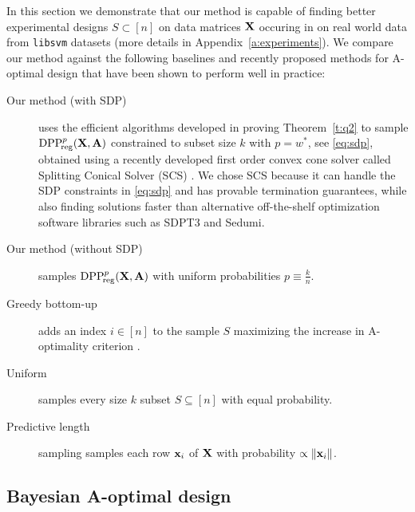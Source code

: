 In this section we demonstrate that our method is capable of finding better
experimental designs $S \subset [n]$ on data matrices $\mathbf X$ occuring in on real
world data from \texttt{libsvm} datasets \citep{libsvm} (more details in
Appendix~\ref{a:experiments}).
We compare our method against the following baselines and recently proposed methods
for A-optimal design that have been shown to perform well in
practice:
\begin{description}
    \item[Our method (with SDP)] uses the efficient algorithms
        developed in proving Theorem~\ref{t:q2} to sample
        ${{\mathrm{DPP}}_{\!\mathrm{reg}}^{p}}(\mathbf X,\mathbf A)$ constrained to subset size $k$
        with $p = w^*$, see \eqref{eq:sdp},
        obtained using a         recently developed first order convex cone solver called Splitting
        Conical Solver (SCS) \citep{o2016conic}.
        We chose SCS because it can handle the SDP constraints in
        \eqref{eq:sdp} and has provable termination guarantees, while
        also finding solutions faster \citep{o2016conic} than alternative
        off-the-shelf optimization software libraries such as SDPT3 and Sedumi.

    \item[Our method (without SDP)] samples ${{\mathrm{DPP}}_{\!\mathrm{reg}}^{p}}(\mathbf X,\mathbf A)$ with uniform
      probabilities $p \equiv \frac{k}{n}$.

          \item[Greedy bottom-up] adds an index $i \in [n]$ to the sample $S$
        maximizing the increase in A-optimality criterion
        \citep{greedy-supermodular,chamon2017approximate}.

    \item[Uniform] samples every size $k$ subset $S \subseteq [n]$
        with equal probability.

    \item[Predictive length] sampling \citep{zhu2015optimal} samples
        each row $\mathbf x_i$ of $\mathbf X$ with probability $\propto\|\mathbf x_i\|$.
\end{description}

\subsection{Bayesian A-optimal design}

